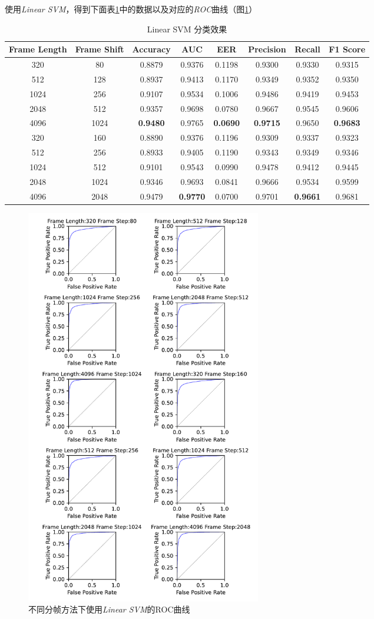 \documentclass[a4paper]{article}
\begin{document}
使用\emph{Linear SVM}，得到下面表\ref{tab:Linear SVM}中的数据以及对应的\emph{ROC}曲线（图\ref{fig:ROC Linear SVM}）
\begin{table}[ht]
  \caption{Linear SVM 分类效果}
  \label{tab:Linear SVM}
  \centering
  \begin{tabular}{c|c|c|c|c|c|c|c}
    \toprule
    \textbf{Frame Length} & \textbf{Frame Shift} & \textbf{Accuracy} & \textbf{AUC} & \textbf{EER} & \textbf{Precision} & \textbf{Recall} & \textbf{F1 Score}\\
    \midrule
    320 & 80 & 0.8879 & 0.9376 & 0.1198 & 0.9300 & 0.9330 & 0.9315 \\
    512 & 128 & 0.8937 & 0.9413 & 0.1170 & 0.9349 & 0.9352 & 0.9350 \\
    1024 & 256 & 0.9107 & 0.9534 & 0.1006 & 0.9486 & 0.9419 & 0.9453 \\
    2048 & 512 & 0.9357 & 0.9698 & 0.0780 & 0.9667 & 0.9545 & 0.9606 \\
    4096 & 1024 & \textbf{0.9480} & 0.9765 & \textbf{0.0690} & \textbf{0.9715} & 0.9650 & \textbf{0.9683} \\
    320 & 160 & 0.8890 & 0.9376 & 0.1196 & 0.9309 & 0.9337 & 0.9323 \\
    512 & 256 & 0.8933 & 0.9405 & 0.1190 & 0.9343 & 0.9349 & 0.9346 \\
    1024 & 512 & 0.9101 & 0.9543 & 0.0990 & 0.9478 & 0.9412 & 0.9445 \\
    2048 & 1024 & 0.9346 & 0.9693 & 0.0841 & 0.9666 & 0.9534 & 0.9599 \\
    4096 & 2048 & 0.9479 & \textbf{0.9770} & 0.0700 & 0.9701 & \textbf{0.9661} & 0.9681 \\
    \bottomrule
  \end{tabular}
\end{table}

\begin{figure}[H]
  \centering
  \includegraphics[width=0.5\textwidth]{figs/ROC_Linear_SVM.pdf}
  \caption{不同分帧方法下使用\emph{Linear SVM}的ROC曲线}
  \label{fig:ROC Linear SVM}
\end{figure}
\end{document}
